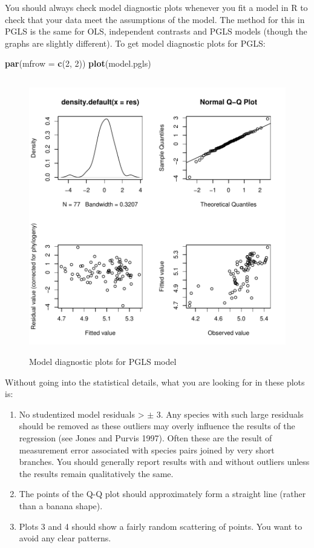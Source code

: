 \documentclass[12pt]{article}
\newcommand{\KeywordTok}[1]{\textcolor[rgb]{0.13,0.29,0.53}{\textbf{{#1}}}}
\newcommand{\DataTypeTok}[1]{\textcolor[rgb]{0.13,0.29,0.53}{{#1}}}
\newcommand{\DecValTok}[1]{\textcolor[rgb]{0.00,0.00,0.81}{{#1}}}
\newcommand{\NormalTok}[1]{{#1}}
\begin{document}
You should always check model diagnostic plots whenever you fit a model in R to check that your data meet the assumptions of the model. The method for this in PGLS is the same for OLS, independent contrasts and PGLS models (though the graphs are slightly different). To get model diagnostic plots for PGLS:

\begin{snugshade}
\begin{Highlighting}[]
\KeywordTok{par}\NormalTok{(}\DataTypeTok{mfrow =} \KeywordTok{c}\NormalTok{(}\DecValTok{2}\NormalTok{, }\DecValTok{2}\NormalTok{))}
\KeywordTok{plot}\NormalTok{(model.pgls)}
\end{Highlighting}
\end{snugshade}

\begin{figure}[H]
\centering
\includegraphics[width = 40cm, height = 12cm, keepaspectratio=true]{Diagnosticplot.pdf}
\caption{Model diagnostic plots for PGLS model}
\label{figure}
\end{figure}

Without going into the statistical details, what you are looking for in these plots is:
\begin{enumerate}
\item No studentized model residuals > $\pm$ 3. 
Any species with such large residuals should be removed as these outliers may overly influence the results of the regression (see Jones and Purvis 1997). Often these are the result of measurement error associated with species pairs joined by very short branches. You should generally report results with and without outliers unless the results remain qualitatively the same.
\item The points of the Q-Q plot should approximately form a straight line (rather than a banana shape).
\item Plots 3 and 4 should show a fairly random scattering of points. You want to avoid any clear patterns.
\end{enumerate}
\end{document}
